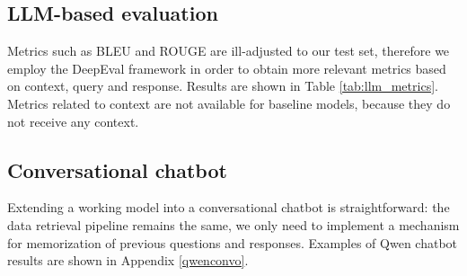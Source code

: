 \documentclass[fleqn,moreauthors,10pt]{ds_report}
\begin{document}
\subsection*{LLM-based evaluation}

Metrics such as BLEU and ROUGE are ill-adjusted to our test set, therefore we employ the DeepEval framework \cite{deepeval} in order to obtain more relevant metrics based on context, query and response. Results are shown in Table \ref{tab:llm_metrics}. Metrics related to context are not available for baseline models, because they do not receive any context. 

\begin{table*}[!htb]
{}
\caption{Performance comparison as evaluated by a 14B parameter Qwen model with GEval framework.}
\label{tab:llm_metrics}
\end{table*}


\subsection*{Conversational chatbot}

Extending a working model into a conversational chatbot is straightforward: the data retrieval pipeline remains the same, we only need to implement a mechanism for memorization of previous questions and responses. Examples of Qwen chatbot results are shown in Appendix \ref{qwenconvo}.


\end{document}
